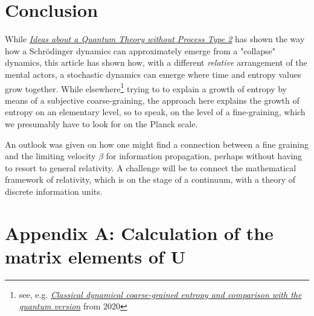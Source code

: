 \documentclass[12pt]{article}
\begin{document}



\section{Conclusion}

While \emph{\href{https://docs.google.com/document/d/1OrmVETmnBSe5c0CpTbKH8Vq5pWFuB8QUez-KqHTaarQ/edit?usp=sharing}{Ideas about a Quantum Theory without Process Type 2}} has shown the way how a Schrödinger dynamics can approximately emerge from a "collapse" dynamics, this article has shown how, with a different \emph{relative} arrangement of the mental actors, a stochastic dynamics can emerge where time and entropy values grow together. While elsewhere\footnote{see, e.g. \emph{\href{https://arxiv.org/abs/1905.03841}{Classical dynamical coarse-grained entropy and comparison with the quantum version}} from 2020}  trying to to explain a growth of entropy by means of a subjective coarse-graining, the approach here explains the growth of entropy on an elementary level, so to speak, on the level of a fine-graining, which we presumably have to look for on the Planck scale.

An outlook was given on how one might find a connection between a fine graining and the limiting velocity $\beta$ for information propagation, perhaps without having to resort to general relativity. A challenge will be to connect the mathematical framework of relativity, which is on the stage of a continuum, with a theory of discrete information units.

\newpage
\section{Appendix A: Calculation of the matrix elements of U}
\end{document}
